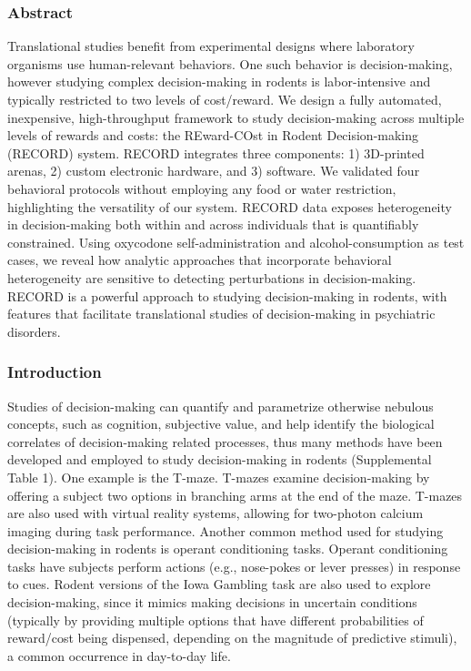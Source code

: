 \documentclass{article}
\begin{document}
\subsubsection{Abstract}
Translational studies benefit from experimental designs where laboratory organisms use human-relevant behaviors. One such behavior is decision-making, however studying complex decision-making in rodents is labor-intensive and typically restricted to two levels of cost/reward. We design a fully automated, inexpensive, high-throughput framework to study decision-making across multiple levels of rewards and costs: the REward-COst in Rodent Decision-making (RECORD) system. RECORD integrates three components: 1) 3D-printed arenas, 2) custom electronic hardware, and 3) software. We validated four behavioral protocols without employing any food or water restriction, highlighting the versatility of our system. RECORD data exposes heterogeneity in decision-making both within and across individuals that is quantifiably constrained. Using oxycodone self-administration and alcohol-consumption as test cases, we reveal how analytic approaches that incorporate behavioral heterogeneity are sensitive to detecting perturbations in decision-making. RECORD is a powerful approach to studying decision-making in rodents, with features that facilitate translational studies of decision-making in psychiatric disorders.

\clearpage

\subsubsection{Introduction}
Studies of decision-making can quantify and parametrize otherwise nebulous concepts, such as cognition\cite{shadlen2013decision}, subjective value\cite{glimcher2013neuroeconomics}, and help identify the
biological correlates of decision-making related processes\cite{friedman2015corticostriatal, amemori2021causal, johnson2007neural, xiang2019behavioral, kira2023distributed}, thus many methods have been developed and employed to study decision-making in
rodents (Supplemental Table 1). One example is the T-maze. T-mazes examine decision-making by offering a subject two options in branching arms at the end of the maze\cite{friedman2015corticostriatal, johnson2007neural, xiang2019behavioral, d2021apparatus}. T-mazes are also used with virtual reality systems, allowing for two-photon calcium imaging during task performance\cite{kira2023distributed}. Another common method used for studying decision-making in rodents is operant conditioning tasks\cite{de2023freibox}. Operant conditioning tasks have subjects perform actions (e.g., nose-pokes\cite{kapanaiah2021low, vassilev2022custom} or lever presses\cite{vollmer2021novel}) in response to cues. Rodent versions of the Iowa Gambling task are also used to explore decision-making, since it mimics making decisions in uncertain conditions (typically by providing multiple options that have different probabilities of reward/cost being dispensed, depending on the magnitude of predictive stimuli), a common occurrence in day-to-day life\cite{de2011rodent}.
\end{document}

